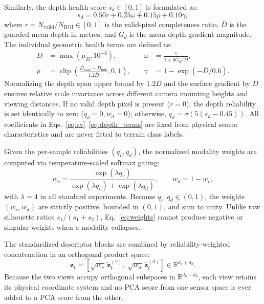 \documentclass[11pt, a4paper]{article}
\begin{document}
Similarly, the depth health score $s_d \in [0,1]$ is formulated as:
\begin{equation}
s_d = 0.50 r + 0.25 \omega + 0.15 \rho + 0.10 \gamma,
\label{eq:sd}
\end{equation}
where $r=N_{\mathrm{valid}}/N_{\mathrm{ROI}}\in[0,1]$ is the valid-pixel completeness ratio, $\bar{D}$ is the guarded mean depth in metres, and $\bar{G}_d$ is the mean depth-gradient magnitude. The individual geometric health terms are defined as:
\begin{equation}
\begin{aligned}
\bar{D} &= \max(\mu_D,10^{-6}), \quad &
\omega &= \frac{1}{1+6\bar{G}_d/\bar{D}}, \\
\rho &= \operatorname{clip}\!\left(\frac{D_{\max}-D_{\min}}{1.2\bar{D}},0,1\right), \quad &
\gamma &= 1-\exp(-\bar{D}/0.6).
\end{aligned}
\label{eq:depth_terms}
\end{equation}
Normalizing the depth span upper bound by $1.2\bar{D}$ and the surface gradient by $\bar{D}$ ensures relative scale invariance across different camera mounting heights and viewing distances. If no valid depth pixel is present ($r=0$), the depth reliability is set identically to zero ($q_d = 0, w_d = 0$); otherwise, $q_d=\sigma(5(s_d-0.45))$. All coefficients in Eqs.~\eqref{eq:sv}--\eqref{eq:depth_terms} are fixed from physical sensor characteristics and are never fitted to terrain class labels.

Given the per-sample reliabilities $(q_v, q_d)$, the normalized modality weights are computed via temperature-scaled softmax gating:
\begin{equation}
w_v = \frac{\exp(\lambda q_v)}{\exp(\lambda q_v)+\exp(\lambda q_d)},
\qquad
w_d = 1-w_v,
\label{eq:weights}
\end{equation}
with $\lambda=4$ in all standard experiments. Because $q_v, q_d \in (0,1)$, the weights $(w_v, w_d)$ are strictly positive, bounded in $(0,1)$, and sum to unity. Unlike raw silhouette ratios $s_1/(s_1+s_2)$, Eq.~\eqref{eq:weights} cannot produce negative or singular weights when a modality collapses.

The standardized descriptor blocks are combined by reliability-weighted concatenation in an orthogonal product space:
\begin{equation}
\mathbf{z}_t =
\left[
\sqrt{w_v}\,\tilde{\mathbf{z}}^{(v)}_t,\;
\sqrt{w_d}\,\tilde{\mathbf{z}}^{(d)}_t
\right] \in \mathbb{R}^{d_v + d_d}.
\label{eq:fusion}
\end{equation}
Because the two views occupy orthogonal subspaces in $\mathbb{R}^{d_v + d_d}$, each view retains its physical coordinate system and no PCA score from one sensor space is ever added to a PCA score from the other.
\end{document}
